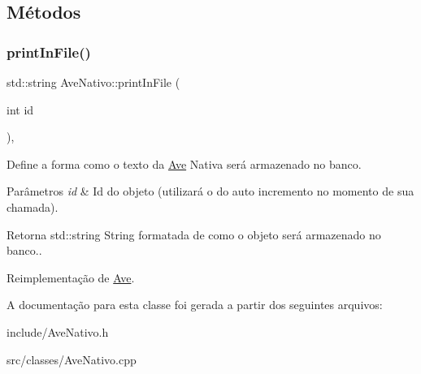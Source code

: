 \subsection{Métodos}
\mbox{\label{classAveNativo_ab95679ed20354b2183706db24899d316}} 
\subsubsection{\texorpdfstring{print\+In\+File()}{printInFile()}}
{\footnotesize\ttfamily std\+::string Ave\+Nativo\+::print\+In\+File (\begin{DoxyParamCaption}\item[{int}]{id }\end{DoxyParamCaption})\hspace{0.3cm}{\ttfamily [protected]}, {\ttfamily [virtual]}}



Define a forma como o texto da \hyperlink{classAve}{Ave} Nativa será armazenado no banco. 


\begin{DoxyParams}{Parâmetros}
{\em id} & Id do objeto (utilizará o do auto incremento no momento de sua chamada). \\
\hline
\end{DoxyParams}
\begin{DoxyReturn}{Retorna}
std\+::string String formatada de como o objeto será armazenado no banco.. 
\end{DoxyReturn}


Reimplementação de \hyperlink{classAve_a41d6ba4bf7e4823274211a9ae908ff1f}{Ave}.



A documentação para esta classe foi gerada a partir dos seguintes arquivos\+:\begin{DoxyCompactItemize}
\item 
include/Ave\+Nativo.\+h\item 
src/classes/Ave\+Nativo.\+cpp\end{DoxyCompactItemize}
